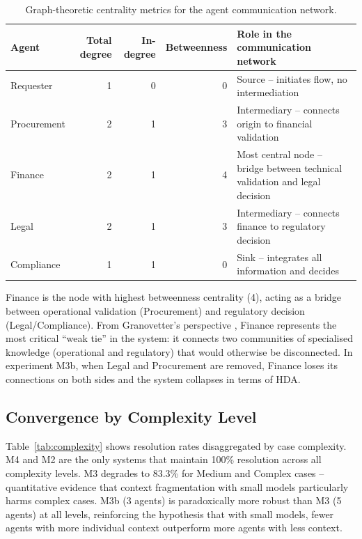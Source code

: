\documentclass[preprint,12pt,authoryear]{elsarticle}
\begin{document}
\begin{table}[htbp]
\centering
\caption{Graph-theoretic centrality metrics for the agent communication network.}
\label{tab:graph}
\begin{tabularx}{\textwidth}{lrrrX}
\toprule
\textbf{Agent} & \textbf{Total degree} & \textbf{In-degree} &
  \textbf{Betweenness} & \textbf{Role in the communication network} \\
\midrule
Requester   & 1 & 0 & 0 & Source -- initiates flow, no intermediation \\
Procurement & 2 & 1 & 3 & Intermediary -- connects origin to financial validation \\
Finance     & 2 & 1 & 4 & Most central node -- bridge between technical validation and legal decision \\
Legal       & 2 & 1 & 3 & Intermediary -- connects finance to regulatory decision \\
Compliance  & 1 & 1 & 0 & Sink -- integrates all information and decides \\
\bottomrule
\end{tabularx}
\end{table}

Finance is the node with highest betweenness centrality (4), acting as a bridge
between operational validation (Procurement) and regulatory decision
(Legal/Compliance).
From Granovetter's perspective \citeyearpar{granovetter1973}, Finance represents
the most critical ``weak tie'' in the system: it connects two communities of
specialised knowledge (operational and regulatory) that would otherwise be
disconnected.
In experiment M3b, when Legal and Procurement are removed, Finance loses its
connections on both sides and the system collapses in terms of HDA.

\subsection{Convergence by Complexity Level}

Table~\ref{tab:complexity} shows resolution rates disaggregated by case
complexity.
M4 and M2 are the only systems that maintain 100\% resolution across all
complexity levels.
M3 degrades to 83.3\% for Medium and Complex cases -- quantitative evidence
that context fragmentation with small models particularly harms complex cases.
M3b (3 agents) is paradoxically more robust than M3 (5 agents) at all levels,
reinforcing the hypothesis that with small models, fewer agents with more
individual context outperform more agents with less context.
\end{document}
